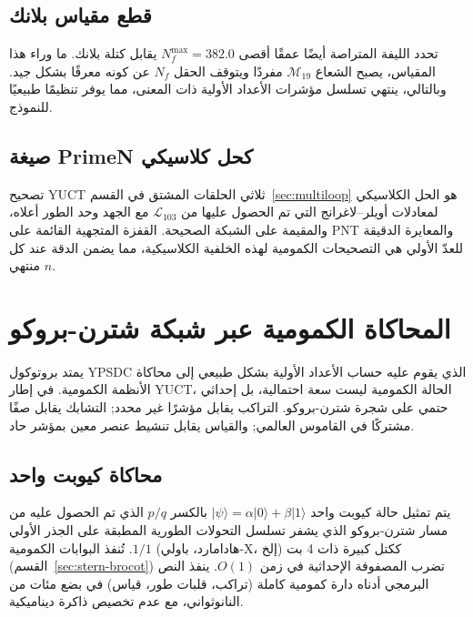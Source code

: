 \documentclass[11pt,a4paper]{article}
\begin{document}
	\subsection{قطع مقياس بلانك}
	
	تحدد الليفة المتراصة أيضًا عمقًا أقصى \(N_f^{\max} = 382.0\) يقابل كتلة بلانك. ما وراء هذا المقياس، يصبح الشعاع \(\mathcal{M}_{19}\) مفردًا ويتوقف الحقل \(N_f\) عن كونه معرفًا بشكل جيد. وبالتالي، ينتهي تسلسل مؤشرات الأعداد الأولية ذات المعنى، مما يوفر تنظيمًا طبيعيًا للنموذج.
	
	\subsection{صيغة PrimeN كحل كلاسيكي}
	
	تصحيح YUCT ثلاثي الحلقات المشتق في القسم~\ref{sec:multiloop} هو الحل الكلاسيكي لمعادلات أويلر–لاغرانج التي تم الحصول عليها من \(\mathcal{L}_{103}\) مع الجهد وحد الطور أعلاه، والمقيمة على الشبكة الصحيحة. القفزة المتجهية القائمة على PNT والمعايرة الدقيقة للعدّ الأولي هي التصحيحات الكمومية لهذه الخلفية الكلاسيكية، مما يضمن الدقة عند كل \(n\) منتهي.
	
	\section{المحاكاة الكمومية عبر شبكة شترن-بروكو}
	\label{sec:quantum-emulation}
	
	يمتد بروتوكول YPSDC الذي يقوم عليه حساب الأعداد الأولية بشكل طبيعي إلى محاكاة الأنظمة الكمومية. في إطار YUCT، الحالة الكمومية ليست سعة احتمالية، بل إحداثي حتمي على شجرة شترن-بروكو. التراكب يقابل مؤشرًا غير محدد; التشابك يقابل صفًا مشتركًا في القاموس العالمي; والقياس يقابل تنشيط عنصر معين بمؤشر حاد.
	
	\subsection{محاكاة كيوبت واحد}
	
	يتم تمثيل حالة كيوبت واحد \(\vert\psi\rangle = \alpha\vert0\rangle + \beta\vert1\rangle\) بالكسر \(p/q\) الذي تم الحصول عليه من مسار شترن-بروكو الذي يشفر تسلسل التحولات الطورية المطبقة على الجذر الأولي \(1/1\). تُنفذ البوابات الكمومية (هادامارد، باولي-X، إلخ) ككتل كبيرة ذات 4 بت (القسم~\ref{sec:stern-brocot}) تضرب المصفوفة الإحداثية في زمن \(O(1)\). ينفذ النص البرمجي أدناه دارة كمومية كاملة (تراكب، قلبات طور، قياس) في بضع مئات من النانوثواني، مع عدم تخصيص ذاكرة ديناميكية.
	
\end{document}
